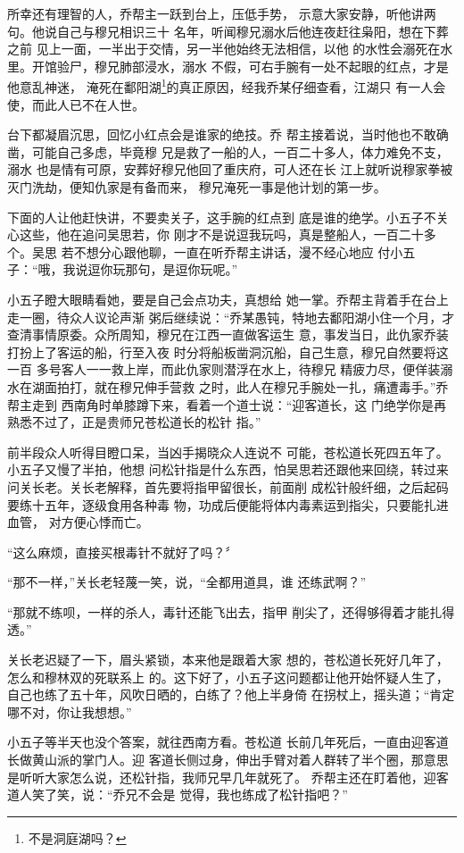 所幸还有理智的人，乔帮主一跃到台上，压低手势，
示意大家安静，听他讲两句。他说自己与穆兄相识三十
名年，听闻穆兄溺水后他连夜赶往枭阳，想在下葬之前
见上一面，一半出于交情，另一半他始终无法相信，以他
的水性会溺死在水里。开馆验尸，穆兄肺部浸水，溺水
不假，可右手腕有一处不起眼的红点，才是他意乱神迷，
淹死在鄱阳湖\footnote{不是洞庭湖吗？}的真正原因，经我乔某仔细查看，江湖只
有一人会使，而此人已不在人世。

台下都凝眉沉思，回忆小红点会是谁家的绝技。乔
帮主接着说，当时他也不敢确凿，可能自己多虑，毕竟穆
兄是救了一船的人，一百二十多人，体力难免不支，溺水
也是情有可原，安葬好穆兄他回了重庆府，可人还在长
江上就听说穆家拳被灭门洗劫，便知仇家是有备而来，
穆兄淹死一事是他计划的第一步。

下面的人让他赶快讲，不要卖关子，这手腕的红点到
底是谁的绝学。小五子不关心这些，他在追问吴思若，你
刚才不是说逗我玩吗，真是整船人，一百二十多个。吴思
若不想分心跟他聊，一直在听乔帮主讲话，漫不经心地应
付小五子：“哦，我说逗你玩那句，是逗你玩呢。”

小五子瞪大眼睛看她，要是自己会点功夫，真想给
她一掌。乔帮主背着手在台上走一圈，待众人议论声渐
粥后继续说：“乔某愚钝，特地去鄱阳湖小住一个月，才
查清事情原委。众所周知，穆兄在江西一直做客运生
意，事发当日，此仇家乔装打扮上了客运的船，行至入夜
时分将船板凿洞沉船，自己生意，穆兄自然要将这一百
多号客人一一救上岸，而此仇家则潜浮在水上，待穆兄
精疲力尽，便佯装溺水在湖面拍打，就在穆兄伸手营救
之时，此人在穆兄手腕处一扎，痛遭毒手。”乔帮主走到
西南角时单膝蹲下来，看着一个道士说：“迎客道长，这
门绝学你是再熟悉不过了，正是贵师兄苍松道长的松针
指。”

前半段众人听得目瞪口呆，当凶手揭晓众人连说不
可能，苍松道长死四五年了。小五子又慢了半拍，他想
问松针指是什么东西，怕吴思若还跟他来回绕，转过来
问关长老。关长老解释，首先要将指甲留很长，前面削
成松针般纤细，之后起码要练十五年，逐级食用各种毒
物，功成后便能将体内毒素运到指尖，只要能扎进血管，
对方便心悸而亡。

“这么麻烦，直接买根毒针不就好了吗？〞

“那不一样，”关长老轻蔑一笑，说，“全都用道具，谁
还练武啊？”

“那就不练呗，一样的杀人，毒针还能飞出去，指甲
削尖了，还得够得着才能扎得透。”

关长老迟疑了一下，眉头紧锁，本来他是跟着大家
想的，苍松道长死好几年了，怎么和穆林双的死联系上
的。这下好了，小五子这问题都让他开始怀疑人生了，
自己也练了五十年，风吹日晒的，白练了？他上半身倚
在拐杖上，摇头道；“肯定哪不对，你让我想想。”

小五子等半天也没个答案，就往西南方看。苍松道
长前几年死后，一直由迎客道长做黄山派的掌门人。迎
客道长侧过身，伸出手臂对着人群转了半个圈，那意思
是听听大家怎么说，还松针指，我师兄早几年就死了。
乔帮主还在盯着他，迎客道人笑了笑，说：“乔兄不会是
觉得，我也练成了松针指吧？”

